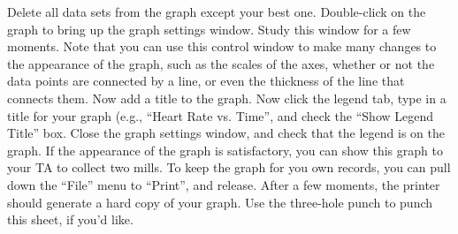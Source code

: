 Delete all data sets from the graph except your best one.  Double-click on the graph to bring up the graph settings window.  Study this window for a few moments.  Note that you can use this control window to make many changes to the appearance of the graph, such as the scales of the axes, whether or not the data points are connected by a line, or even the thickness of the line that connects them.  Now add a title to the graph.  Now click the legend tab, type in a title for your graph (e.g., ``Heart Rate vs. Time'', and check the ``Show Legend Title'' box.  Close the graph settings window, and check that the legend is on the graph.  If the appearance of the graph is satisfactory, you can show this graph to your TA to collect two mills.  To keep the graph for you own records, you can pull down the ``File'' menu to ``Print'', and release.  After a few moments, the printer should generate a hard copy of your graph.  Use the three-hole punch to punch this sheet, if you'd like.
